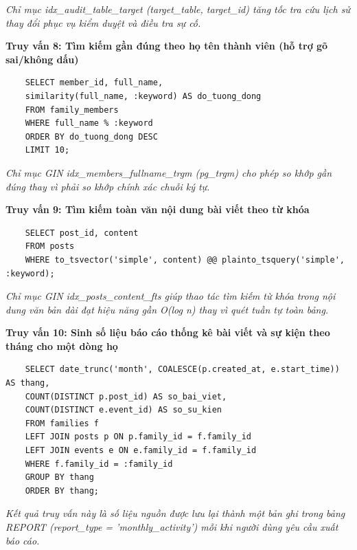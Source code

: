 \textit{Chỉ mục idx\_audit\_table\_target (target\_table, target\_id) tăng tốc tra cứu lịch sử thay đổi phục vụ kiểm duyệt và điều tra sự cố.}

\textbf{Truy vấn 8: Tìm kiếm gần đúng theo họ tên thành viên (hỗ trợ gõ sai/không dấu)}

\begin{lstlisting}
	SELECT member_id, full_name,
	similarity(full_name, :keyword) AS do_tuong_dong
	FROM family_members
	WHERE full_name % :keyword
	ORDER BY do_tuong_dong DESC
	LIMIT 10;
\end{lstlisting}

\textit{Chỉ mục GIN idx\_members\_fullname\_trgm (pg\_trgm) cho phép so khớp gần đúng thay vì phải so khớp chính xác chuỗi ký tự.}

\textbf{Truy vấn 9: Tìm kiếm toàn văn nội dung bài viết theo từ khóa}

\begin{lstlisting}
	SELECT post_id, content
	FROM posts
	WHERE to_tsvector('simple', content) @@ plainto_tsquery('simple', :keyword);
\end{lstlisting}

\textit{Chỉ mục GIN idx\_posts\_content\_fts giúp thao tác tìm kiếm từ khóa trong nội dung văn bản dài đạt hiệu năng gần O(log n) thay vì quét tuần tự toàn bảng.}

\textbf{Truy vấn 10: Sinh số liệu báo cáo thống kê bài viết và sự kiện theo tháng cho một dòng họ}

\begin{lstlisting}
	SELECT date_trunc('month', COALESCE(p.created_at, e.start_time)) AS thang,
	COUNT(DISTINCT p.post_id) AS so_bai_viet,
	COUNT(DISTINCT e.event_id) AS so_su_kien
	FROM families f
	LEFT JOIN posts p ON p.family_id = f.family_id
	LEFT JOIN events e ON e.family_id = f.family_id
	WHERE f.family_id = :family_id
	GROUP BY thang
	ORDER BY thang;
\end{lstlisting}

\textit{Kết quả truy vấn này là số liệu nguồn được lưu lại thành một bản ghi trong bảng REPORT (report\_type = 'monthly\_activity') mỗi khi người dùng yêu cầu xuất báo cáo.}
